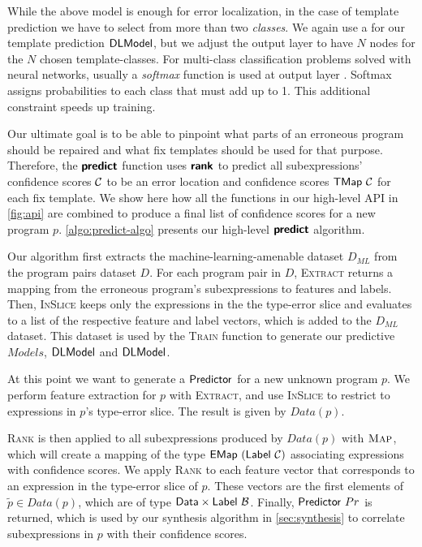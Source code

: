 While the above model is enough for error localization, in the case of template
prediction we have to select from more than two \emph{classes}. We again use a
\dnn for our template prediction $\mathsf{DLModel}$, but we adjust the output layer to
have $N$ nodes for the $N$ chosen template-classes. For multi-class
classification problems solved with neural networks, usually a \emph{softmax}
function is used at output layer \citep{Goodfellow-et-al-2016,Bishop-book-2006}.
Softmax assigns probabilities to each class that must add up to 1.
This additional constraint speeds up training.



Our ultimate goal is to be able to pinpoint what parts of an erroneous program
should be repaired and what fix templates should be used for that purpose.
Therefore, the $\bm{\mathsf{predict}}$ function uses $\bm{\mathsf{rank}}$ to predict all
subexpressions' confidence scores $\mathcal{C}$ to be an error location and confidence
scores $\mathsf{TMap}\ \mathcal{C}$ for each fix template. We show here how all the functions
in our high-level API in \autoref{fig:api} are combined to produce a final list
of confidence scores for a new program $p$. \autoref{algo:predict-algo} presents
our high-level $\bm{\mathsf{predict}}$ algorithm.

Our algorithm first extracts the machine-learning-amenable dataset $D_{ML}$
from the program pairs dataset $D$. For each program pair in $D$,
\textsc{Extract} returns a mapping from the erroneous program's subexpressions
to features and labels. Then, \textsc{InSlice} keeps only the expressions in
the the type-error slice and evaluates to a list of the respective feature and
label vectors, which is added to the $D_{ML}$ dataset. This dataset
is used by the \textsc{Train} function to generate our predictive $Models$, \ie
$\mathsf{DLModel}$ and $\mathsf{DLModel}$.

At this point we want to generate a $\mathsf{Predictor}$ for a new unknown program
$p$. We perform feature extraction for $p$ with \textsc{Extract}, and use
\textsc{InSlice} to restrict to expressions in $p$'s type-error slice.
The result is given by $Data(p)$.

\textsc{Rank} is then applied to all subexpressions produced by $Data(p)$ with
$\textsc{Map}$, which will create a mapping of the type
$\mathsf{EMap}\ (\mathsf{Label}\ \mathcal{C})$ associating expressions with confidence scores. We
apply \textsc{Rank} to each feature vector that corresponds to an expression in
the type-error slice of $p$. These vectors are the first elements of $\tilde{p}
\in Data(p)$, which are of type $\mathsf{Data} \times \mathsf{Label}\ \mathcal{B}$. Finally,
$\mathsf{Predictor}\ Pr$ is returned, which is used by our synthesis algorithm in
\autoref{sec:synthesis} to correlate subexpressions in $p$ with their confidence
scores.
